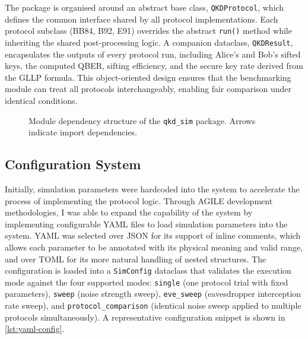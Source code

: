\documentclass[10pt, a4paper]{report}
\begin{document}
The package is organised around an abstract base class, \texttt{QKDProtocol}, which defines the common interface shared by all protocol implementations. Each protocol subclass (BB84, B92, E91) overrides the abstract \texttt{run()} method while inheriting the shared post-processing logic. A companion dataclass, \texttt{QKDResult}, encapsulates the outputs of every protocol run, including Alice's and Bob's sifted keys, the computed QBER, sifting efficiency, and the secure key rate derived from the GLLP formula. This object-oriented design ensures that the benchmarking module can treat all protocols interchangeably, enabling fair comparison under identical conditions.

\begin{figure}[ht]
    \centering
    \caption{Module dependency structure of the \texttt{qkd\_sim} package. Arrows indicate import dependencies.}
    \label{fig:architecture}
\end{figure}

\subsection{Configuration System}
Initially, simulation parameters were hardcoded into the system to accelerate the process of implementing the protocol logic. Through AGILE development methodologies, I was able to expand the capability of the system by implementing configurable YAML files to load simulation parameters into the system. YAML was selected over JSON for its support of inline comments, which allows each parameter to be annotated with its physical meaning and valid range, and over TOML for its more natural handling of nested structures. The configuration is loaded into a \texttt{SimConfig} dataclass that validates the execution mode against the four supported modes: \texttt{single} (one protocol trial with fixed parameters), \texttt{sweep} (noise strength sweep), \texttt{eve\_sweep} (eavesdropper interception rate sweep), and \texttt{protocol\_comparison} (identical noise sweep applied to multiple protocols simultaneously). A representative configuration snippet is shown in \cref{lst:yaml-config}.
\end{document}
